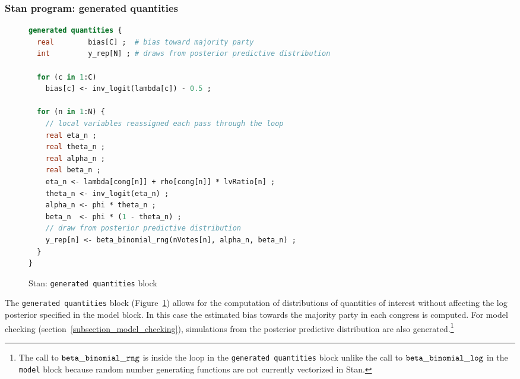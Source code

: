 \subsubsection{Stan program: generated quantities}

\begin{figure}[t]
\begin{lstlisting}[language=Stan, frame=trBL]
generated quantities {
  real        bias[C] ;  # bias toward majority party
  int         y_rep[N] ; # draws from posterior predictive distribution
  
  for (c in 1:C) 
    bias[c] <- inv_logit(lambda[c]) - 0.5 ;
  
  for (n in 1:N) {
    // local variables reassigned each pass through the loop
    real eta_n ;
    real theta_n ;
    real alpha_n ;
    real beta_n ;
    eta_n <- lambda[cong[n]] + rho[cong[n]] * lvRatio[n] ;
    theta_n <- inv_logit(eta_n) ;    
    alpha_n <- phi * theta_n ;
    beta_n  <- phi * (1 - theta_n) ;
    // draw from posterior predictive distribution
    y_rep[n] <- beta_binomial_rng(nVotes[n], alpha_n, beta_n) ;
  }
}
\end{lstlisting}
\caption{Stan: {\tt generated quantities} block}
\label{stan_generated_quantities}
\end{figure}

The {\tt generated quantities} block (Figure~\ref{stan_generated_quantities}) allows for the computation 
of distributions of quantities of interest without affecting the log posterior specified in the model block. 
In this case the estimated bias towards the majority party in each congress is computed. For model 
checking (section~\ref{subsection_model_checking}), simulations from the posterior predictive distribution 
are also generated.\footnote{The call to ${\tt beta\_binomial\_rng}$ is inside the loop in the 
{\tt generated quantities} block unlike the call to ${\tt beta\_binomial\_log}$ in the {\tt model} block because 
random number generating functions are not currently vectorized in Stan.} 


